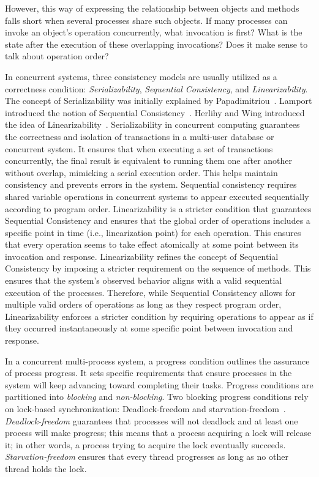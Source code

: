 However, this way of expressing the relationship between objects and methods falls short when several processes share such objects. If many processes can invoke an object's operation concurrently, what invocation is first? What is the state after the execution of these overlapping invocations? Does it make sense to talk about operation order?

In concurrent systems, three consistency models are usually utilized as a correctness condition: \textit{Serializability}, \textit{Sequential Consistency}, and \textit{Linearizability}. The concept of Serializability was initially explained by Papadimitriou~\cite{DBLP_journals_jacm_Papadimitriou79b}. Lamport introduced the notion of Sequential Consistency~\cite{lamport1979how}. Herlihy and Wing introduced the idea of Linearizability~\cite{DBLP_journals_toplas_HerlihyW90}.
Serializability in concurrent computing guarantees the correctness and isolation of transactions in a multi-user database or concurrent system. It ensures that when executing a set of transactions concurrently, the final result is equivalent to running them one after another without overlap, mimicking a serial execution order. This helps maintain consistency and prevents errors in the system.
Sequential consistency requires shared variable operations in concurrent systems to appear executed sequentially according to program order. Linearizability is a stricter condition that guarantees Sequential Consistency and ensures that the global order of operations includes a specific point in time (i.e., linearization point) for each operation. This ensures that every operation seems to take effect atomically at some point between its invocation and response. Linearizability refines the concept of Sequential Consistency by imposing a stricter requirement on the sequence of methods. This ensures that the system's observed behavior aligns with a valid sequential execution of the processes. Therefore, while Sequential Consistency allows for multiple valid orders of operations as long as they respect program order, Linearizability enforces a stricter condition by requiring operations to appear as if they occurred instantaneously at some specific point between invocation and response.

In a concurrent multi-process system, a progress condition outlines the assurance of process progress. It sets specific requirements that ensure processes in the system will keep advancing toward completing their tasks. Progress conditions are partitioned into \textit{blocking} and \textit{non-blocking}. Two blocking progress conditions rely on lock-based synchronization: Deadlock-freedom and starvation-freedom~\cite{DBLP_books_daglib_0020056}. \textit{Deadlock-freedom} guarantees that processes will not deadlock and at least one process will make progress; this means that a process acquiring a lock will release it; in other words, a process trying to acquire the lock eventually succeeds. \textit{Starvation-freedom} ensures that every thread progresses as long as no other thread holds the lock.

